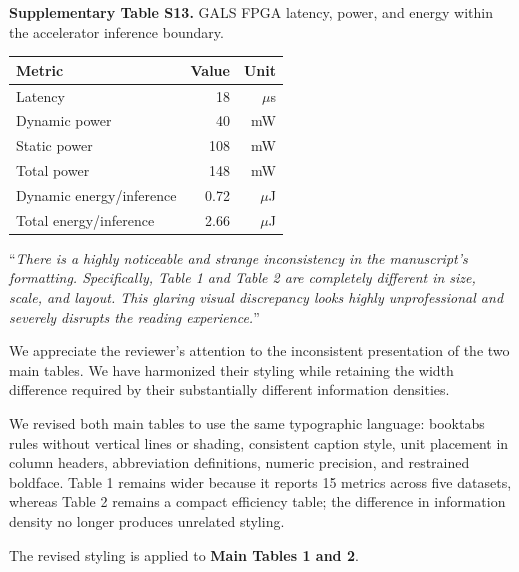 \documentclass[12pt,technote,onecolumn]{IEEEtran}
\newcommand{\ResponseTableFormat}{%
  \footnotesize
  \renewcommand{\arraystretch}{1.2}%
  \setlength{\tabcolsep}{4pt}%
}
\begin{document}
\newcommand{\EvidenceSuppTableSThirteen}{%
\noindent\begin{minipage}{\linewidth}
\smallskip\noindent\textbf{Supplementary Table S13.} GALS FPGA latency, power, and energy within the accelerator inference boundary.
\begin{center}
\ResponseTableFormat
\begin{tabular*}{\linewidth}{@{\extracolsep{\fill}}lrr@{}}
\toprule
Metric & Value & Unit \\
\midrule
Latency & 18 & $\mu$s \\
Dynamic power & 40 & mW \\
Static power & 108 & mW \\
Total power & 148 & mW \\
Dynamic energy/inference & 0.72 & $\mu$J \\
Total energy/inference & 2.66 & $\mu$J \\
\bottomrule
\end{tabular*}
\end{center}
\end{minipage}\par\medskip
}
\EvidenceSuppTableSThirteen
\vspace{4mm}

``{\it There is a highly noticeable and strange inconsistency in the
manuscript's formatting. Specifically, Table 1 and Table 2 are
completely different in size, scale, and layout. This glaring visual
discrepancy looks highly unprofessional and severely disrupts the
reading experience.}''
\vspace{1mm}


We appreciate the reviewer's attention to the inconsistent presentation of the two main tables. We have harmonized their styling while retaining the width difference required by their substantially different information densities.

We revised both main tables to use the same typographic language:
booktabs rules without vertical lines or shading, consistent caption
style, unit placement in column headers, abbreviation definitions,
numeric precision, and restrained boldface. Table 1 remains wider
because it reports 15 metrics across five datasets, whereas Table 2
remains a compact efficiency table; the difference in information
density no longer produces unrelated styling.



The revised styling is applied to \textbf{Main Tables 1 and 2}.
\end{document}
